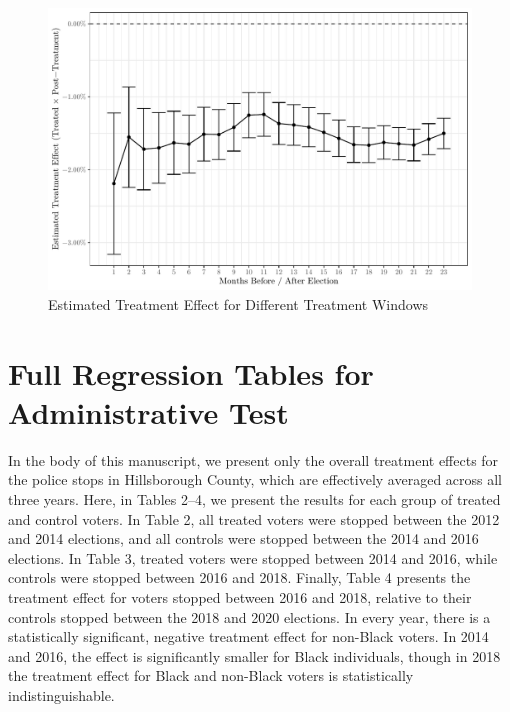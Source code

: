 \documentclass[
  12pt,
]{article}
\begin{document}
\begin{figure}[!htb]

{\centering \includegraphics{si_files/figure-latex/windows-1} 

}

\caption{\label{fig:rob-window}Estimated Treatment Effect for Different Treatment Windows}\label{fig:windows}
\end{figure}

\hypertarget{full-regression-tables-for-administrative-test}{%
\section{Full Regression Tables for Administrative Test}\label{full-regression-tables-for-administrative-test}}

In the body of this manuscript, we present only the overall treatment effects for the police stops in Hillsborough County, which are effectively averaged across all three years. Here, in Tables 2--4, we present the results for each group of treated and control voters. In Table 2, all treated voters were stopped between the 2012 and 2014 elections, and all controls were stopped between the 2014 and 2016 elections. In Table 3, treated voters were stopped between 2014 and 2016, while controls were stopped between 2016 and 2018. Finally, Table 4 presents the treatment effect for voters stopped between 2016 and 2018, relative to their controls stopped between the 2018 and 2020 elections. In every year, there is a statistically significant, negative treatment effect for non-Black voters. In 2014 and 2016, the effect is significantly smaller for Black individuals, though in 2018 the treatment effect for Black and non-Black voters is statistically indistinguishable.
\end{document}

